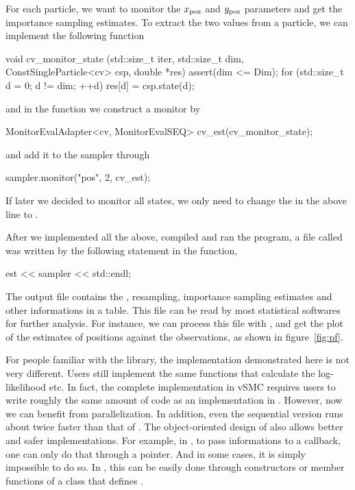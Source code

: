 \documentclass[11pt, fontset=Minion, showoverfull,
bib, mintcode, minted=cache]{marticle}
\begin{document}
For each particle, we want to monitor the $x_{\mathrm{pos}}$ and $y_{\mathrm{pos}}$ parameters and
get the importance sampling estimates. To extract the two values from a
particle, we can implement the following function
\begin{cppcode}
void cv_monitor_state (std::size_t iter, std::size_t dim,
    ConstSingleParticle<cv> csp, double *res)
{
    assert(dim <= Dim);
    for (std::size_t d = 0; d != dim; ++d)
        res[d] = csp.state(d);
}
\end{cppcode}
and in the  function we construct a monitor by
\begin{cppcode}
MonitorEvalAdapter<cv, MonitorEvalSEQ> cv_est(cv_monitor_state);
\end{cppcode}
and add it to the sampler through
\begin{cppcode}
sampler.monitor("pos", 2, cv_est);
\end{cppcode}
If later we decided to monitor all states, we only need to change the
 in the above line to .

After we implemented all the above, compiled and ran the program, a file
called  was written by the following statement in the
 function,
\begin{cppcode}
est << sampler << std::endl;
\end{cppcode}
The output file contains the \ess, resampling, importance sampling estimates
and other informations in a table. This file can be read by most statistical
softwares for further analysis. For instance, we can process this file with
\lrlang, and get the plot of the estimates of positions against the
observations, as shown in figure~\ref{fig:pf}.

For people familiar with the \lsmctc library, the implementation demonstrated
here is not very different. Users still implement the same functions that
calculate the log-likelihood etc. In fact, the complete implementation in vSMC
requires users to write roughly the same amount of code as an implementation
in \lsmctc. However, now we can benefit from parallelization. In addition,
even the sequential version runs about twice faster than that of \lsmctc. The
object-oriented design of \vsmc also allows better and safer implementations.
For example, in \lsmctc, to pass informations to a callback, one can only do
that through a  pointer. And in some cases, it is simply
impossible to do so. In \vsmc, this can be easily done through constructors or
member functions of a class that defines .
\end{document}
